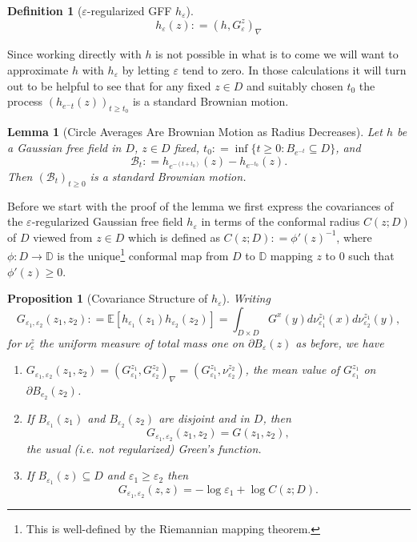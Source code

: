\documentclass[11pt,reqno]{amsart}
\numberwithin{equation}{section}
\newtheorem{lem}[thm]{Lemma}
\newtheorem{pro}[thm]{Proposition}
\newtheorem{defi}[thm]{Definition}
\newcommand{\deq}{\mathrel{\mathop:}=}
\newcommand{\eps}{\varepsilon}
\begin{document}
\begin{defi}[$\eps$-regularized GFF $h_\eps$]
	$$h_\eps(z)\deq (h,G_\eps^z)_\nabla$$
\end{defi}

Since working directly with $h$ is not possible in what is to come we will want to approximate $h$ with $h_\eps$ by letting $\eps$ tend to zero. In those calculations it will turn out to be helpful to see that for any fixed $z\in D$ and suitably chosen $t_0$ the process $(h_{e^-t}(z))_{t\geq t_0}$ is a standard Brownian motion.

\begin{lem}[Circle Averages Are Brownian Motion as Radius Decreases]\label{lem:hepsIsBM}
	Let $h$ be a Gaussian free field in $D$, $z\in D$ fixed, $t_0\deq\inf\{t\geq 0: B_{e^{-t}}\subseteq D\}$, and $$\mathcal B_t\deq h_{e^{-(t+t_0)}}(z)-h_{e^{-t_0}}(z).$$
	Then $(\mathcal B_t)_{t\geq 0}$ is a standard Brownian motion.
\end{lem}

Before we start with the proof of the lemma we first express the covariances of the $\eps$-regularized Gaussian free field $h_\eps$ in terms of the conformal radius $C(z;D)$ of $D$ viewed from $z\in D$ which is defined as $C(z;D)\deq \phi'(z)^{-1}$, where $\phi:D\rightarrow\mathbb D$ is the unique\footnote{This is well-defined by the Riemannian mapping theorem.} conformal map from $D$ to $\mathbb D$ mapping $z$ to $0$ such that $\phi'(z)\geq 0$.

\begin{pro}[Covariance Structure of $h_\eps$]\label{prop:covariancesOfRegularizedH}
	Writing $$G_{\eps_1,\eps_2}(z_1,z_2) \deq \mathbb E[h_{\eps_1}(z_1)h_{\eps_2}(z_2)] = \int_{D\times D} G^x(y)d\nu_{\eps_1}^{z_1}(x)d\nu_{\eps_2}^{z_1}(y),$$ for $\nu_\eps^z$ the uniform measure of total mass one on $\partial B_\eps(z)$ as before, we have
	\begin{enumerate}
		\item $G_{\eps_1,\eps_2}(z_1,z_2) = (G_{\eps_1}^{z_1},G_{\eps_2}^{z_2})_\nabla = (G_{\eps_1}^{z_1},\nu_{\eps_2}^{z_2})$, the mean value of $G_{\eps_1}^{z_1}$ on $\partial B_{e_2}(z_2)$.
		\item If $B_{\eps_1}(z_1)$ and $B_{\eps_2}(z_2)$ are disjoint and in $D$, then $$G_{\eps_1,\eps_2}(z_1,z_2) = G(z_1,z_2),$$ the usual (i.e. not regularized) Green's function.
		\item\label{item:covarianceForSameZdifferentEps} If $B_{\eps_1}(z)\subseteq D$ and $\eps_1\geq\eps_2$ then $$G_{\eps_1,\eps_2}(z,z)=-\log\eps_1+\log C(z;D).$$
	\end{enumerate}
\end{pro}
\end{document}
